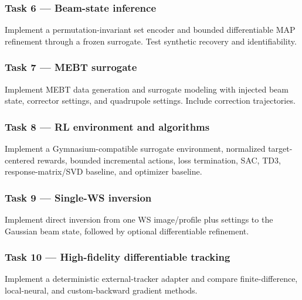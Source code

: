 \documentclass[
]{article}
\begin{document}
\hypertarget{task-6-beam-state-inference}{%
\subsubsection{Task 6 --- Beam-state
inference}\label{task-6-beam-state-inference}}

Implement a permutation-invariant set encoder and bounded differentiable
MAP refinement through a frozen surrogate. Test synthetic recovery and
identifiability.

\hypertarget{task-7-mebt-surrogate}{%
\subsubsection{Task 7 --- MEBT surrogate}\label{task-7-mebt-surrogate}}

Implement MEBT data generation and surrogate modeling with injected beam
state, corrector settings, and quadrupole settings. Include correction
trajectories.

\hypertarget{task-8-rl-environment-and-algorithms}{%
\subsubsection{Task 8 --- RL environment and
algorithms}\label{task-8-rl-environment-and-algorithms}}

Implement a Gymnasium-compatible surrogate environment, normalized
target-centered rewards, bounded incremental actions, loss termination,
SAC, TD3, response-matrix/SVD baseline, and optimizer baseline.

\hypertarget{task-9-single-ws-inversion}{%
\subsubsection{Task 9 --- Single-WS
inversion}\label{task-9-single-ws-inversion}}

Implement direct inversion from one WS image/profile plus settings to
the Gaussian beam state, followed by optional differentiable refinement.

\hypertarget{task-10-high-fidelity-differentiable-tracking}{%
\subsubsection{Task 10 --- High-fidelity differentiable
tracking}\label{task-10-high-fidelity-differentiable-tracking}}

Implement a deterministic external-tracker adapter and compare
finite-difference, local-neural, and custom-backward gradient methods.
\end{document}
